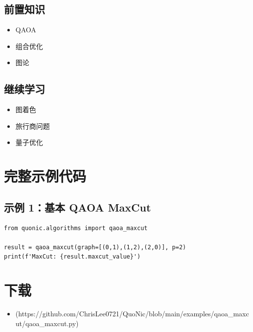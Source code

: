 \documentclass[12pt,a4paper]{article}
\begin{document}
\subsection{前置知识}
\begin{itemize}
  \item QAOA
  \item 组合优化
  \item 图论
\end{itemize}

\subsection{继续学习}
\begin{itemize}
  \item 图着色
  \item 旅行商问题
  \item 量子优化
\end{itemize}

\section{完整示例代码}

\subsection{示例 1：基本 QAOA MaxCut}

\begin{verbatim}
from quonic.algorithms import qaoa_maxcut

result = qaoa_maxcut(graph=[(0,1),(1,2),(2,0)], p=2)
print(f'MaxCut: {result.maxcut_value}')
\end{verbatim}

\section{下载}

\begin{itemize}
  \item [qaoa\_maxcut.py](https://github.com/ChrisLee0721/QuoNic/blob/main/examples/qaoa_maxcut/qaoa_maxcut.py)
\end{itemize}
\end{document}

